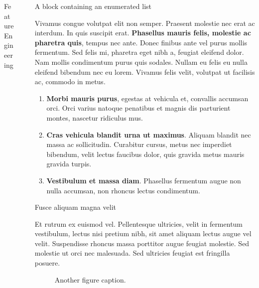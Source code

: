 \documentclass[final]{beamer}
\newlength{\sepwidth}
\newlength{\colwidth}
\newcommand{\separatorcolumn}{\begin{column}{\sepwidth}\end{column}}
\begin{document}
\begin{frame}[t]
\begin{columns}[t]
\begin{column}{\colwidth}
\begin{block}{Feature Engineering}
  \end{block}

\end{column}

\separatorcolumn%

\begin{column}{\colwidth}

  \begin{block}{A block containing an enumerated list}

    Vivamus congue volutpat elit non semper. Praesent molestie nec erat ac
    interdum. In quis suscipit erat. \textbf{Phasellus mauris felis, molestie
    ac pharetra quis}, tempus nec ante. Donec finibus ante vel purus mollis
    fermentum. Sed felis mi, pharetra eget nibh a, feugiat eleifend dolor. Nam
    mollis condimentum purus quis sodales. Nullam eu felis eu nulla eleifend
    bibendum nec eu lorem. Vivamus felis velit, volutpat ut facilisis ac,
    commodo in metus.

    \begin{enumerate}
      \item \textbf{Morbi mauris purus}, egestas at vehicula et, convallis
        accumsan orci. Orci varius natoque penatibus et magnis dis parturient
        montes, nascetur ridiculus mus.
      \item \textbf{Cras vehicula blandit urna ut maximus}. Aliquam blandit nec
        massa ac sollicitudin. Curabitur cursus, metus nec imperdiet bibendum,
        velit lectus faucibus dolor, quis gravida metus mauris gravida turpis.
      \item \textbf{Vestibulum et massa diam}. Phasellus fermentum augue non
        nulla accumsan, non rhoncus lectus condimentum.
    \end{enumerate}

  \end{block}

  \begin{block}{Fusce aliquam magna velit}

    Et rutrum ex euismod vel. Pellentesque ultricies, velit in fermentum
    vestibulum, lectus nisi pretium nibh, sit amet aliquam lectus augue vel
    velit. Suspendisse rhoncus massa porttitor augue feugiat molestie. Sed
    molestie ut orci nec malesuada. Sed ultricies feugiat est fringilla
    posuere.

    \begin{figure}
      \centering
      \caption{Another figure caption.}
    \end{figure}


\end{block}
\end{column}
\end{columns}
\end{frame}
\end{document}

